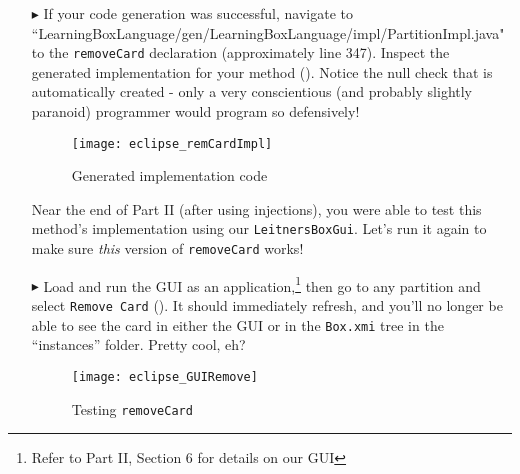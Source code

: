 \begin{itemize}

\item[$\blacktriangleright$] If your code generation was successful, navigate to
``Learning\-Box\-Language/\-gen/\-Learning\-Box\-Language/\-impl/\-Partition\-Impl.java" to the \texttt{\-remove\-Card} declaration (approximately line 347).
Inspect the generated implementation for your method (). Notice the null check that is automatically created - only a very
conscientious (and probably slightly paranoid) programmer would program so defensively!

\vspace{0.5cm}

\begin{figure}[htp]
\begin{center}
  \texttt{[image: eclipse\_remCardImpl]}
  \caption{Generated implementation code}
  \label{eclipse:remCardImpl}
\end{center}
\end{figure}

\newpage

Near the end of Part II (after using injections), you were able to test this method's implementation using our \texttt{LeitnersBoxGui}. Let's run it again to
make sure \emph{this} version of \texttt{removeCard} works!

\item[$\blacktriangleright$] Load and run the GUI as an application,\footnote{Refer to Part II, Section 6 for details on our GUI} then go to any partition and
select \texttt{Remove Card} ().
It should immediately refresh, and you'll no longer be able to see the card in either the GUI or in the \texttt{Box.xmi} tree in the ``instances'' folder.
Pretty cool, eh?

\vspace{1cm}

\begin{figure}[htp]
\begin{center}
  \texttt{[image: eclipse\_GUIRemove]}
  \caption{Testing \texttt{removeCard}}
  \label{eclipse:GUIRemCard}
\end{center}
\end{figure}

\end{itemize}